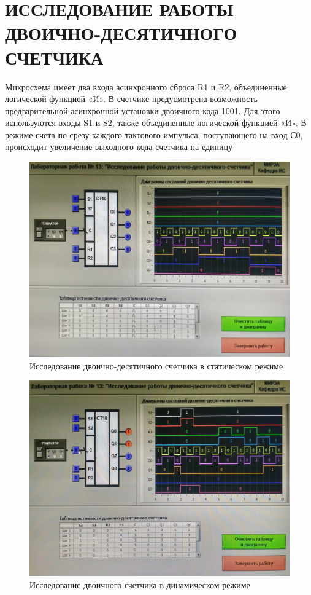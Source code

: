 \section{ИССЛЕДОВАНИЕ РАБОТЫ ДВОИЧНО-ДЕСЯТИЧНОГО СЧЕТЧИКА
}

Микросхема имеет два входа асинхронного сброса R1 и R2, объединенные логической функцией «И». В счетчике предусмотрена возможность предварительной асинхронной установки двоичного кода 1001. Для
этого используются входы S1 и S2, также объединенные логической функцией «И». В режиме счета по срезу каждого тактового импульса, поступающего на вход С0, происходит увеличение выходного кода счетчика на
единицу
\begin{figure}[H]
	\centering
	\includegraphics[width=0.95\linewidth]{imgs/13/1.jpg}
	\caption{Исследование двоично-десятичного счетчика в статическом режиме}
	\label{fig:13_1}
\end{figure}

\begin{figure}[H]
	\centering
	\includegraphics[width=0.95\linewidth]{imgs/13/2.jpg}
	\caption{Исследование двоичного счетчика в динамическом режиме}
	\label{fig:13_2}
\end{figure}

